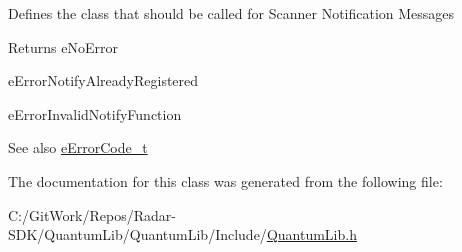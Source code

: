 Defines the class that should be called for Scanner Notification Messages \begin{DoxyReturn}{Returns}
e\+No\+Error 

e\+Error\+Notify\+Already\+Registered 

e\+Error\+Invalid\+Notify\+Function 
\end{DoxyReturn}
\begin{DoxySeeAlso}{See also}
\mbox{\hyperlink{namespace_quantum_lib_ae3625bf7f9a1ca0d93adb9a2e0194d47}{e\+Error\+Code\+\_\+t}} 
\end{DoxySeeAlso}


The documentation for this class was generated from the following file\+:\begin{DoxyCompactItemize}
\item 
C\+:/\+Git\+Work/\+Repos/\+Radar-\/\+S\+D\+K/\+Quantum\+Lib/\+Quantum\+Lib/\+Include/\mbox{\hyperlink{_quantum_lib_8h}{Quantum\+Lib.\+h}}\end{DoxyCompactItemize}
